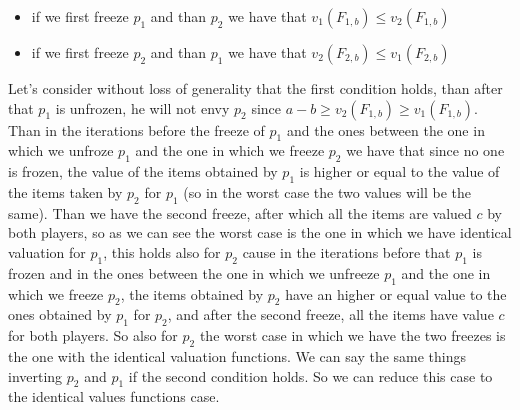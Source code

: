 \begin{itemize}
    \item if we first freeze $p_1$ and than $p_2$ we have that $v_1(F_{1,b})\le v_2(F_{1,b})$
    \item if we first freeze $p_2$ and than $p_1$ we have that $v_2(F_{2,b})\le v_1(F_{2,b})$
\end{itemize}
Let's consider without loss of generality that the first condition holds, than after that $p_1$ is unfrozen, he will not envy $p_2$ since $a-b\ge v_2(F_{1,b}) \ge v_1(F_{1,b})$. Than in the iterations before the freeze of $p_1$  and the ones between the one in which we unfroze $p_1$ and the one in which we freeze $p_2$ we have that since no one is frozen, the value of the items obtained by $p_1$ is higher or equal to the value of the items taken by $p_2$ for $p_1$ (so in the worst case the two values will be the same). Than we have the second freeze, after which all the items are valued $c$ by both players, so as we can see the worst case is the one in which we have identical valuation for $p_1$, this holds also for $p_2$ cause in the iterations before that $p_1$ is frozen and in the ones between the one in which we unfreeze $p_1$ and the one in which we freeze $p_2$, the items obtained by $p_2$ have an higher or equal value to the ones obtained by $p_1$ for $p_2$, and after the second freeze, all the items have value $c$ for both players. So also for $p_2$ the worst case in which we have the two freezes is the one with the identical valuation functions.
We can say the same things inverting $p_2$ and $p_1$ if the second condition holds. So we can reduce this case to the identical values functions case.
\\

